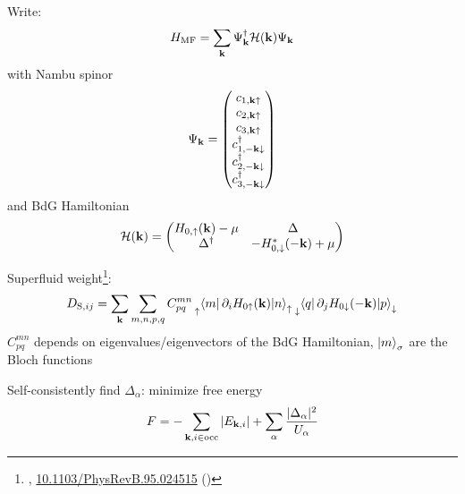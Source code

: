 \documentclass[aspectratio=169]{beamer}
\begin{document}
\begin{frame}
	Write:
	\begin{equation}
		H_{\mathrm{MF}} = \sum_{\mathbf{k}} \Psi_{\mathbf{k}}^{\dagger} \mathcal{H} (\mathbf{k}) \Psi_{\mathbf{k}}
	\end{equation}
	with Nambu spinor
	\begin{equation}
		\Psi_{\mathbf{k}} =
		\begin{pmatrix}
			c_{1, \mathbf{k} \uparrow} \\
			c_{2, \mathbf{k} \uparrow} \\
			c_{3, \mathbf{k} \uparrow} \\
			c_{1, -\mathbf{k} \downarrow}^{\dagger} \\
			c_{2, -\mathbf{k} \downarrow}^{\dagger} \\
			c_{3, -\mathbf{k} \downarrow}^{\dagger} \\
		\end{pmatrix}
	\end{equation}
	and BdG Hamiltonian
	\begin{equation}
		\mathcal{H} (\mathbf{k}) =
		\begin{pmatrix}
			H_{0, \uparrow} (\mathbf{k}) - \mu & \Delta \\
			\Delta^{\dagger} & - H_{0, \downarrow}^* (-\mathbf{k}) + \mu
		\end{pmatrix}
	\end{equation}
\end{frame}

\begin{frame}
	Superfluid weight\footnote{\citeauthor{liangBandGeometryBerry2017}, \href{https://doi.org/10.1103/PhysRevB.95.024515}{10.1103/PhysRevB.95.024515} (\citeyear{liangBandGeometryBerry2017})}:
	\begin{equation}
		D_{\mathrm{S}, ij} = \sum_{\vb{k}} \sum_{m,n,p,q} C_{pq}^{mn} 
		\prescript{}{\uparrow}{\braket{m | \pdif{i} H_{0 \uparrow} (\vb{k}) | n}_{\uparrow}} \prescript{}{\downarrow}{\braket{q | \pdif{j} H_{0 \downarrow} (-\vb{k}) | p}_{\downarrow}}
	\end{equation}
	\(C_{pq}^{mn}\) depends on eigenvalues/eigenvectors of the BdG Hamiltonian, \(\ket{m}_{\sigma}\) are the Bloch functions\pause
	
	Self-consistently find \(\Delta_{\alpha}\): minimize free energy
	\begin{equation}
		F = - \sum_{\mathbf{k}, i\in \mathrm{occ}} \vert E_{\mathbf{k}, i} \vert + \sum_{\alpha} \frac{\vert \Delta_{\alpha} \vert^2}{U_{\alpha}}
	\end{equation}
\end{frame}
\end{document}
